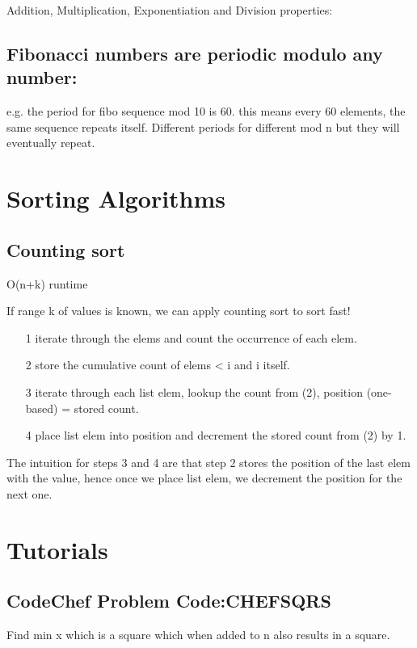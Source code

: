 \documentclass[12pt]{article}
\begin{document}
Addition, Multiplication, Exponentiation and Division properties: 

\subsection{Fibonacci numbers are periodic modulo any number:}
e.g. the period for fibo sequence mod 10 is 60. this means every 60 elements, the same sequence repeats itself. 
Different periods for different mod n but they will eventually repeat. 

\section{Sorting Algorithms} 

\subsection{Counting sort}

O(n+k) runtime 

If range k of values is known, we can apply counting sort to sort fast! 

\begin{itemize} 
	\item[1] iterate through the elems and count the occurrence of each elem. 
	\item[2] store the cumulative count of elems < i and i itself. 
	\item[3] iterate through each list elem, lookup the count from (2), position (one-based) = stored count. 
	\item[4] place list elem into position and decrement the stored count from (2) by 1. 
\end{itemize} 

The intuition for steps 3 and 4 are that step 2 stores the position of the last elem with the value, hence once we place list elem, we decrement the position for the next one. 

\section{Tutorials} 

\subsection{CodeChef Problem Code:CHEFSQRS}
Find min x which is a square which when added to n also results in a square. \\ [\baselineskip] 
\end{document}
